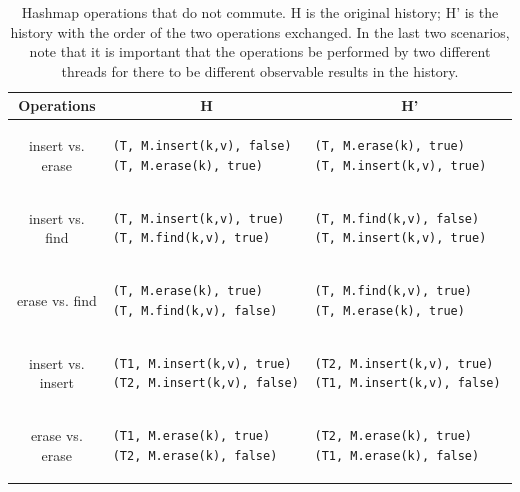 \begin{table}[t]
    \singlespace
    \centering
    \begin{tabular}{|c|l|l|}
        \hline
        Operations & \multicolumn{1}{c}{H} & \multicolumn{1}{|c|}{H'} \\
        \hline
    
        insert vs. erase &
\begin{lstlisting}
(T, M.insert(k,v), false)                       
(T, M.erase(k), true)
\end{lstlisting} &
\begin{lstlisting}
(T, M.erase(k), true)
(T, M.insert(k,v), true)                       
\end{lstlisting}\\
\hline
    insert vs. find &
\begin{lstlisting}
(T, M.insert(k,v), true)                       
(T, M.find(k,v), true)
\end{lstlisting} &
\begin{lstlisting}
(T, M.find(k,v), false)
(T, M.insert(k,v), true)                       
\end{lstlisting}\\
    \hline
   erase vs. find&
\begin{lstlisting}
(T, M.erase(k), true)                       
(T, M.find(k,v), false)
\end{lstlisting} &
\begin{lstlisting}
(T, M.find(k,v), true)                       
(T, M.erase(k), true)
\end{lstlisting}\\
    \hline
    insert vs. insert &
\begin{lstlisting}
(T1, M.insert(k,v), true)                       
(T2, M.insert(k,v), false)
\end{lstlisting} &
\begin{lstlisting}
(T2, M.insert(k,v), true)
(T1, M.insert(k,v), false)                       
\end{lstlisting}\\
\hline
     erase vs. erase&
\begin{lstlisting}
(T1, M.erase(k), true)                       
(T2, M.erase(k), false)
\end{lstlisting} &
\begin{lstlisting}
(T2, M.erase(k), true)                       
(T1, M.erase(k), false)
\end{lstlisting}\\
\hline    
    \end{tabular}
    \caption[Hashmap operations that do not commute]{Hashmap operations that do not commute. H is the original history; H' is the history with the order of the two operations exchanged. In the last two scenarios, note that it is important that the operations be performed by two different threads for there to be different observable results in the history.}
    \label{tab:hm_commute}
    \end{table}

